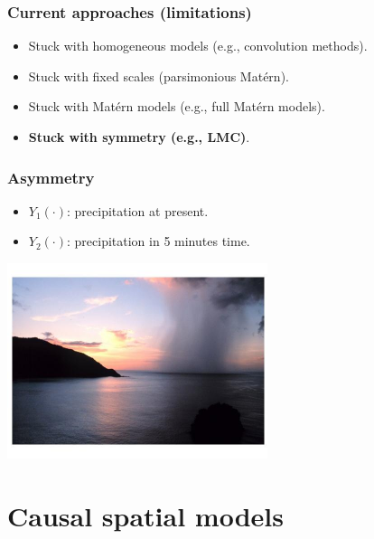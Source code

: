 \documentclass{beamer}
\begin{document}

\begin{frame}
\frametitle{Current approaches (limitations)}

\begin{itemize}
\item Stuck with homogeneous models (e.g., convolution methods). \vfill
\item Stuck with fixed scales (parsimonious Matérn). \vfill
\item Stuck with Matérn models (e.g., full Matérn models). \vfill
\item {\bf Stuck with symmetry (e.g., LMC)}. \vfill
\end{itemize}

\end{frame}


\begin{frame}
\frametitle{Asymmetry}

\begin{itemize}
\item $Y_1(\cdot)$: precipitation at present.
\item $Y_2(\cdot)$: precipitation in 5 minutes time.
\end{itemize}

\begin{center}
\includegraphics[width=3in]{rain.png}
\end{center}
\end{frame}


\section{Causal spatial models}

\begin{frame}
\sectionpage
\end{frame}
\end{document}
